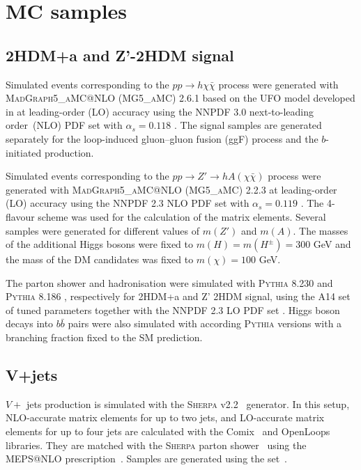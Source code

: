 \section{MC samples}
\label{ch:data-mc-samples}

\subsection{2HDM+a and Z'-2HDM signal}
\label{subsec:signal}

\par Simulated events corresponding to the $pp\to h\chi\bar{\chi}$ process were generated with \textsc{MadGraph5\_aMC@NLO} (\textsc{MG5\_aMC}) 2.6.1 \cite{Alwall:2014hca} 
based on the UFO model developed in \cite{Abe:2018bpo} at leading-order (LO) accuracy using the NNPDF 3.0 next-to-leading order~(NLO) PDF set with $\alpha_s=0.118$ \cite{Ball:2014uwa}. 
The signal samples are generated separately for the loop-induced gluon--gluon fusion (ggF) process and the $b$-initiated production. 

\par Simulated events corresponding to the $pp\to Z'\to h A(\chi\bar{\chi})$ process were generated with \textsc{MadGraph5\_aMC@NLO} (\textsc{MG5\_aMC}) 2.2.3 \cite{Alwall:2014hca} 
at leading-order (LO) accuracy using the NNPDF 2.3 NLO PDF set with $\alpha_s=0.119$ \cite{Ball:2012cx}. 
The 4-flavour scheme was used for the calculation of the matrix elements. Several samples were generated for different values of $m(Z')$ and $m(A)$.
The masses of the additional Higgs bosons were fixed to $m(H)=m(H^{\pm})=300$ GeV and the mass of the DM candidates was fixed to $m(\chi)=100$ GeV. 

\par The parton shower and hadronisation were simulated with \textsc{Pythia} 8.230 \cite{Sjostrand:2014zea} and \textsc{Pythia} 8.186 \cite{Sjostrand:2007gs}, respectively for 2HDM+a and Z' 2HDM signal,
using the A14 set \cite{ATL-PHYS-PUB-2014-021} of tuned parameters together with the NNPDF 2.3 LO PDF set \cite{Ball:2011mu}. 
Higgs boson decays into $b\bar{b}$ pairs were also simulated with according \textsc{Pythia} versions with a branching fraction fixed to the SM prediction.

\subsection{V+jets}

\par $V+$ jets production is simulated with the
\textsc{Sherpa} v2.2~\cite{Bothmann:2019yzt} generator. In this setup, NLO-accurate
matrix elements for up to two jets, and LO-accurate matrix elements for up
to four jets are calculated with the Comix~\cite{Gleisberg:2008fv} and
OpenLoops~\cite{Cascioli:2011va,Denner:2016kdg} libraries. They are matched
with the \textsc{Sherpa} parton shower~\cite{Schumann:2007mg} using the MEPS@NLO
prescription~\cite{Hoeche:2011fd,Hoeche:2012yf,Catani:2001cc,Hoeche:2009rj}.
Samples are generated using the
\nnpdfnnlo set~\cite{Ball:2014uwa}.

